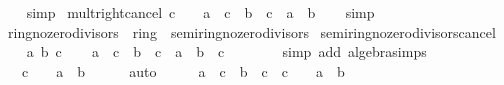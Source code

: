 \begin{isabellebody}
%
\isadelimproof
\ \ %
\endisadelimproof
%
\isatagproof
{}\isamarkupfalse%
\ simp%
\endisatagproof
{\isafoldproof}%
%
\isadelimproof
\isanewline
%
\endisadelimproof
\isanewline
{}\isamarkupfalse%
\ mult{\isacharunderscore}{\kern0pt}right{\isacharunderscore}{\kern0pt}cancel{\isacharcolon}{\kern0pt}\ {\isachardoublequoteopen}c\ {\isasymnoteq}\ {}\ {\isasymLongrightarrow}\ a\ {\isacharasterisk}{\kern0pt}\ c\ {\isacharequal}{\kern0pt}\ b\ {\isacharasterisk}{\kern0pt}\ c\ {\isasymlongleftrightarrow}\ a\ {\isacharequal}{\kern0pt}\ b{\isachardoublequoteclose}\isanewline
%
\isadelimproof
\ \ %
\endisadelimproof
%
\isatagproof
{}\isamarkupfalse%
\ simp%
\endisatagproof
{\isafoldproof}%
%
\isadelimproof
\isanewline
%
\endisadelimproof
\isanewline
{}\isamarkupfalse%
\isanewline
\isanewline
{}\isamarkupfalse%
\ ring{\isacharunderscore}{\kern0pt}no{\isacharunderscore}{\kern0pt}zero{\isacharunderscore}{\kern0pt}divisors\ {\isacharequal}{\kern0pt}\ ring\ {\isacharplus}{\kern0pt}\ semiring{\isacharunderscore}{\kern0pt}no{\isacharunderscore}{\kern0pt}zero{\isacharunderscore}{\kern0pt}divisors\isanewline
{}\isanewline
\isanewline
{}\isamarkupfalse%
\ semiring{\isacharunderscore}{\kern0pt}no{\isacharunderscore}{\kern0pt}zero{\isacharunderscore}{\kern0pt}divisors{\isacharunderscore}{\kern0pt}cancel\isanewline
%
\isadelimproof
%
\endisadelimproof
%
\isatagproof
{}\isamarkupfalse%
\isanewline
\ \ \isamarkupfalse%
\ a\ b\ c\isanewline
\ \ \isamarkupfalse%
\ {\isachardoublequoteopen}a\ {\isacharasterisk}{\kern0pt}\ c\ {\isacharequal}{\kern0pt}\ b\ {\isacharasterisk}{\kern0pt}\ c\ {\isasymlongleftrightarrow}\ {\isacharparenleft}{\kern0pt}a\ {\isacharminus}{\kern0pt}\ b{\isacharparenright}{\kern0pt}\ {\isacharasterisk}{\kern0pt}\ c\ {\isacharequal}{\kern0pt}\ {}{\isachardoublequoteclose}\isanewline
\ \ \ \ \isamarkupfalse%
\ {\isacharparenleft}{\kern0pt}simp\ add{\isacharcolon}{\kern0pt}\ algebra{\isacharunderscore}{\kern0pt}simps{\isacharparenright}{\kern0pt}\isanewline
\ \ \isamarkupfalse%
\ \isamarkupfalse%
\ {\isachardoublequoteopen}{\isasymdots}\ {\isasymlongleftrightarrow}\ c\ {\isacharequal}{\kern0pt}\ {}\ {\isasymor}\ a\ {\isacharequal}{\kern0pt}\ b{\isachardoublequoteclose}\isanewline
\ \ \ \ \isamarkupfalse%
\ auto\isanewline
\ \ \isamarkupfalse%
\ \isamarkupfalse%
\ {\isachardoublequoteopen}a\ {\isacharasterisk}{\kern0pt}\ c\ {\isacharequal}{\kern0pt}\ b\ {\isacharasterisk}{\kern0pt}\ c\ {\isasymlongleftrightarrow}\ c\ {\isacharequal}{\kern0pt}\ {}\ {\isasymor}\ a\ {\isacharequal}{\kern0pt}\ b{\isachardoublequoteclose}\ \isacommand{{\isachardot}{\kern0pt}}\isamarkupfalse%

\end{isabellebody}
